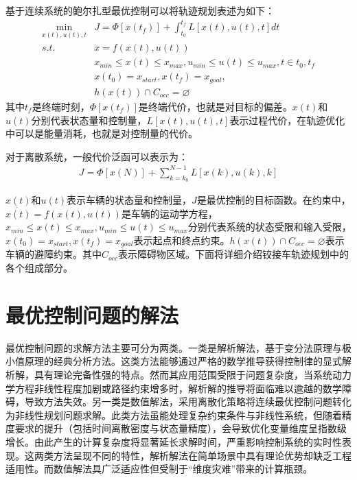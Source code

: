 \documentclass[master,academic]{ysuthesis} %
\begin{document}
	基于连续系统的鲍尔扎型最优控制可以将轨迹规划表述为如下：
	\begin{equation}
		\begin{aligned}
			\min_{x(t),u(t),t} &J = \Phi[x(t_f)]+\int_{t_0}^{t_f}L[x(t),u(t),t]dt\\
			s.t. \ \ \ &\dot{x} = f(x(t),u(t))\\
			&x_{min}\le x(t) \le x_{max},u_{min}\le u(t) \le u_{max},t \in{t_0,t_f}\\
			&x(t_0)=x_{start},x(t_f)=x_{goal},\\
			&h(x(t))\cap C_{occ}=\varnothing 
		\end{aligned}
	\end{equation}
	其中$t_f$是终端时刻，$\Phi[x(t_f)]$是终端代价，也就是对目标的偏差。$x(t)$和$u(t)$分别代表状态量和控制量，$L[x(t),u(t),t]$表示过程代价，在轨迹优化中可以是能量消耗，也就是对控制量的代价。
	
	对于离散系统，一般代价泛函可以表示为：
	\begin{equation}
		\begin{aligned}
			J = \Phi[x(N)]+\sum_{k=k_0}^{N-1}L[x(k),u(k),k]
		\end{aligned}
	\end{equation}

	$x(t)$和$u(t)$表示车辆的状态量和控制量，$J$是最优控制的目标函数。在约束中，$\dot{x(t)}=f(x(t),u(t))$是车辆的运动学方程，$x_{min}\le x(t) \le x_{max},u_{min}\le u(t) \le u_{max}$分别代表系统的状态受限和输入受限，$x(t_0)=x_{start},x(t_f)=x_{goal}$表示起点和终点约束。$h(x(t))\cap C_{occ}=\varnothing$表示车辆的避障约束。其中$C_{occ}$表示障碍物区域。下面将详细介绍铰接车轨迹规划中的各个组成部分。

	\section{最优控制问题的解法}
	最优控制问题的求解方法主要可分为两类。一类是解析解法，基于变分法原理与极小值原理的经典分析方法。这类方法能够通过严格的数学推导获得控制律的显式解析解，具有理论完备性强的特点。然而其应用范围受限于问题复杂度，当系统动力学方程非线性程度加剧或路径约束增多时，解析解的推导将面临难以逾越的数学障碍，导致方法失效。另一类是数值解法，采用离散化策略将连续最优控制问题转化为非线性规划问题求解。此类方法虽能处理复杂约束条件与非线性系统，但随着精度要求的提升（包括时间离散密度与状态量精度），会导致优化变量维度呈指数级增长。由此产生的计算复杂度将显著延长求解时间，严重影响控制系统的实时性表现。这两类方法呈现不同的特性，解析解法在简单场景中具有理论优势却缺乏工程适用性。而数值解法具广泛适应性但受制于“维度灾难”带来的计算瓶颈。
\end{document}
